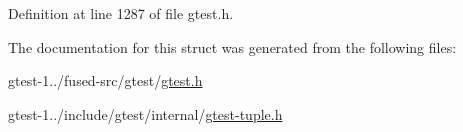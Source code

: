 \-Definition at line 1287 of file gtest.\-h.



\-The documentation for this struct was generated from the following files\-:\begin{DoxyCompactItemize}
\item 
gtest-\/1../fused-\/src/gtest/\hyperlink{fused-src_2gtest_2gtest_8h}{gtest.\-h}\item 
gtest-\/1../include/gtest/internal/\hyperlink{gtest-tuple_8h}{gtest-\/tuple.\-h}\end{DoxyCompactItemize}
